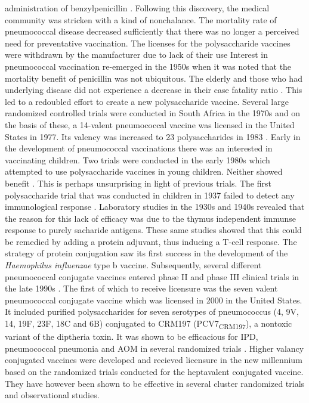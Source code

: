 \documentclass[]{book}
\theoremstyle{definition}
\theoremstyle{definition}
\theoremstyle{definition}
\theoremstyle{remark}
\begin{document}
administration of benzylpenicillin \citep{Tillett1943}. Following this
discovery, the medical community was stricken with a kind of
nonchalance. The mortality rate of pneumococcal disease decreased
sufficiently that there was no longer a perceived need for preventative
vaccination. The licenses for the polysaccharide vaccines were withdrawn
by the manufacturer due to lack of their use \citep{Austrian1999a}
Interest in pneumococcal vaccination re-emerged in the 1950s when it was
noted that the mortality benefit of penicillin was not ubiquitous. The
elderly and those who had underlying disease did not experience a
decrease in their case fatality ratio \citep{Austrian1964}. This led to
a redoubled effort to create a new polysaccharide vaccine. Several large
randomized controlled trials were conducted in South Africa in the 1970s
\citep[\citet{Smit1977}]{Austrian1976} and on the basis of these, a
14-valent pneumococcal vaccine was licensed in the United States in
1977. Its valency was increased to 23 polysaccharides in 1983
\citep{Austrian1999a}. Early in the development of pneumococcal
vaccinations there was an interested in vaccinating children. Two trials
were conducted in the early 1980s which attempted to use polysaccharide
vaccines in young children. Neither showed benefit
\citep{Makela1981, Sloyer1981}. This is perhaps unsurprising in light of
previous trials. The first polysaccharide trial that was conducted in
children in 1937 failed to detect any immunological response
\citep{Davies1937}. Laboratory studies in the 1930s and 1940s revealed
that the reason for this lack of efficacy was due to the thymus
independent immunse response to purely sacharide antigens. These same
studies showed that this could be remedied by adding a protein adjuvant,
thus inducing a T-cell response. The strategy of protein conjugation saw
its first success in the development of the \emph{Haemophilus
influenzae} type b vaccine. Subsequently, several different pneumococcal
conjugate vaccines entered phase II and phase III clinical trials in the
late 1990s \citep{Austrian1999a}. The first of which to receive
licensure was the seven valent pneumococcal conjugate vaccine which was
licensed in 2000 in the United States. It included purified
polysaccharides for seven serotypes of pneumococcus (4, 9V, 14, 19F,
23F, 18C and 6B) conjugated to CRM197 (PCV7\textsubscript{CRM197}), a
nontoxic variant of the diptheria toxin. It was shown to be efficacious
for IPD, pneumococcal pneumonia and AOM in several randomized trials
\citep{Black2000, Black2002c, Eskola2001, Fireman2003, OBrien2003, OBrien2008}.
Higher valancy conjugated vaccines were developed and recieved licensure
in the new millennium based on the randomized trials conducted for the
heptavalent conjugated vaccine. They have however been shown to be
effective in several cluster randomized trials and observational
studies.
\end{document}

